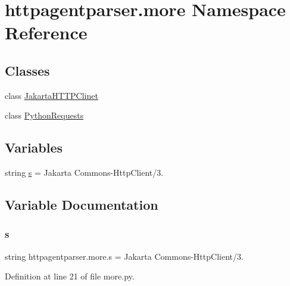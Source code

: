 \hypertarget{namespacehttpagentparser_1_1more}{}\section{httpagentparser.\+more Namespace Reference}
\label{namespacehttpagentparser_1_1more}
\subsection*{Classes}
\begin{DoxyCompactItemize}
\item 
class \hyperlink{classhttpagentparser_1_1more_1_1_jakarta_h_t_t_p_clinet}{Jakarta\+H\+T\+T\+P\+Clinet}
\item 
class \hyperlink{classhttpagentparser_1_1more_1_1_python_requests}{Python\+Requests}
\end{DoxyCompactItemize}
\subsection*{Variables}
\begin{DoxyCompactItemize}
\item 
string \hyperlink{namespacehttpagentparser_1_1more_abf09bf90e060242712fdd9b16ddb1acd}{s} = \textquotesingle{}Jakarta Commons-\/Http\+Client/3.\textquotesingle{}
\end{DoxyCompactItemize}


\subsection{Variable Documentation}
\hypertarget{namespacehttpagentparser_1_1more_abf09bf90e060242712fdd9b16ddb1acd}{}\label{namespacehttpagentparser_1_1more_abf09bf90e060242712fdd9b16ddb1acd} 
\subsubsection{\texorpdfstring{s}{s}}
{\footnotesize\ttfamily string httpagentparser.\+more.\+s = \textquotesingle{}Jakarta Commons-\/Http\+Client/3.\textquotesingle{}}



Definition at line 21 of file more.\+py.


